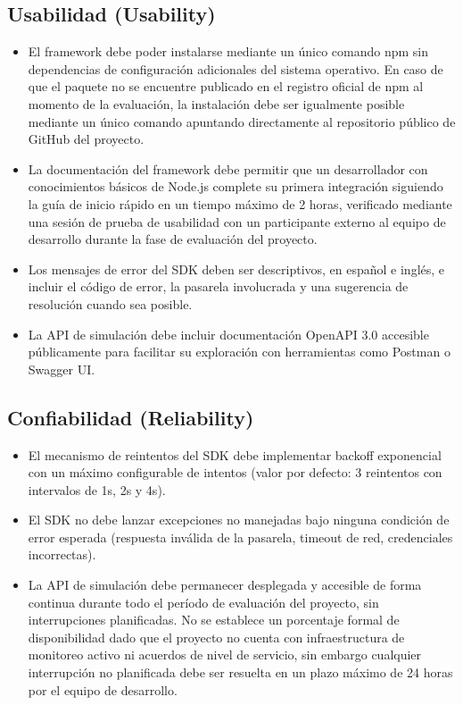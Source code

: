 \documentclass[10pt]{article}
\begin{document}
\subsection{Usabilidad (Usability)}

\begin{itemize}
  \item El framework debe poder instalarse mediante un único comando npm sin dependencias de configuración adicionales del sistema operativo. En caso de que el paquete no se encuentre publicado en el registro oficial de npm al momento de la evaluación, la instalación debe ser igualmente posible mediante un único comando apuntando directamente al repositorio público de GitHub del proyecto.
  \item La documentación del framework debe permitir que un desarrollador con conocimientos básicos de Node.js complete su primera integración siguiendo la guía de inicio rápido en un tiempo máximo de 2 horas, verificado mediante una sesión de prueba de usabilidad con un participante externo al equipo de desarrollo durante la fase de evaluación del proyecto.
  \item Los mensajes de error del SDK deben ser descriptivos, en español e inglés, e incluir el código de error, la pasarela involucrada y una sugerencia de resolución cuando sea posible.
  \item La API de simulación debe incluir documentación OpenAPI 3.0 accesible públicamente para facilitar su exploración con herramientas como Postman o Swagger UI.
\end{itemize}

\subsection{Confiabilidad (Reliability)}

\begin{itemize}
  \item El mecanismo de reintentos del SDK debe implementar backoff exponencial con un máximo configurable de intentos (valor por defecto: 3 reintentos con intervalos de 1s, 2s y 4s).
  \item El SDK no debe lanzar excepciones no manejadas bajo ninguna condición de error esperada (respuesta inválida de la pasarela, timeout de red, credenciales incorrectas).
  \item La API de simulación debe permanecer desplegada y accesible de forma continua durante todo el período de evaluación del proyecto, sin interrupciones planificadas. No se establece un porcentaje formal de disponibilidad dado que el proyecto no cuenta con infraestructura de monitoreo activo ni acuerdos de nivel de servicio, sin embargo cualquier interrupción no planificada debe ser resuelta en un plazo máximo de 24 horas por el equipo de desarrollo.
\end{itemize}
\end{document}
